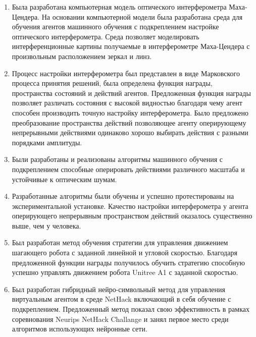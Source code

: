 \begin{enumerate}
  \item Была разработана компьютерная модель оптического интерферометра Маха-Цендера. На основании компьютерной модели была разработана среда для обучения агентов машинного обучения с подкреплением настройке оптического интерферометра. Среда позволяет моделировать интерференционные картины получаемые в интерферометре Маха-Цендера с произвольным расположением зеркал и линз. 
  \item Процесс настройки интерферометра был представлен в виде Марковского процесса принятия решений, была определена функция награды, пространства состояний и действий агентов. Предложенная функция награды позволяет различать состояния с высокой видностью благодаря чему агент способен производить точную настройку интерферометра. Было предложено преобразование пространства действий позволяющее агенту оперирующему непрерывными действиями одинаково хорошо выбирать действия с разными порядками амплитуды. 
  \item Были разработаны и реализованы алгоритмы машинного обучения с подкреплением способные оперировать действиями различного масштаба и устойчивые к оптическим шумам. 
  \item Разработанные алгоритмы были обучены и успешно протестированы на экспериментальной установке. Качество настройки интерферометра у агента оперирующего непрерывным пространством действий оказалось существенно выше, чем у человека. 
  \item Был разработан метод обучения стратегии для управления движением шагающего робота с заданной линейной и угловой скоростью. Благодаря предложенной функции награды получилось обучить стратегию способную успешно управлять движением робота Unitree A1 с заданной скоростью. 
  \item Был разработан гибридный нейро-символьный метод для управления виртуальным агентом в среде NetHack включающий в себя обучение с подкреплением. Предложенный метод показал свою эффективность в рамках соревнования Neurips NetHack Challange и занял первое место среди алгоритмов использующих нейронные сети.
\end{enumerate}

\newpage
